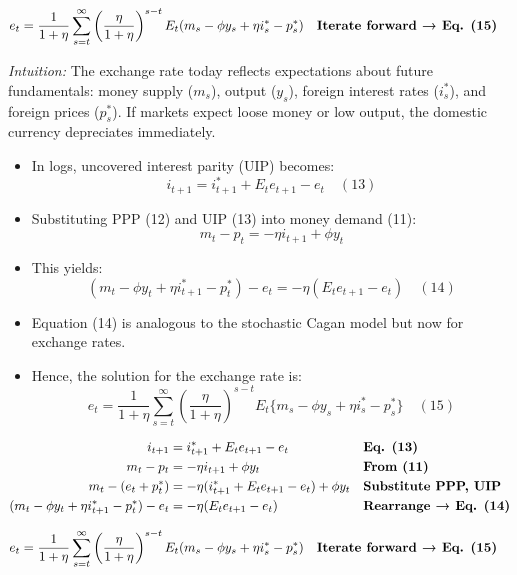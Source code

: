 \documentclass[12pt]{article}
\begin{document}
\begin{align}
e_t &= \frac{1}{1+\eta}\sum_{s=t}^\infty \left(\frac{\eta}{1+\eta}\right)^{s-t} 
E_t(m_s - \phi y_s + \eta i_s^* - p_s^*) && \text{\textbf{Iterate forward → Eq. (15)}}
\end{align}

\textit{Intuition:}  
The exchange rate today reflects expectations about future fundamentals: money supply ($m_s$), output ($y_s$), foreign interest rates ($i_s^*$), and foreign prices ($p_s^*$). If markets expect loose money or low output, the domestic currency depreciates immediately.
\begin{itemize}
    \item In logs, uncovered interest parity (UIP) becomes:  
    \[
        i_{t+1} = i_{t+1}^* + E_t e_{t+1} - e_t \quad (13)
    \]  
    \item Substituting PPP (12) and UIP (13) into money demand (11):  
    \[
        m_t - p_t = -\eta i_{t+1} + \phi y_t
    \]  
    \item This yields:  
    \[
        (m_t - \phi y_t + \eta i_{t+1}^* - p_t^*) - e_t = -\eta(E_t e_{t+1} - e_t) \quad (14)
    \]  
    \item Equation (14) is analogous to the stochastic Cagan model but now for exchange rates.  
    \item Hence, the solution for the exchange rate is:  
    \[
        e_t = \frac{1}{1+\eta}\sum_{s=t}^\infty \left(\frac{\eta}{1+\eta}\right)^{s-t} E_t\{m_s - \phi y_s + \eta i_s^* - p_s^*\} \quad (15)
    \]  
\end{itemize}

\singlespacing
\begin{align}
i_{t+1} &= i_{t+1}^* + E_t e_{t+1} - e_t && \text{\textbf{Eq. (13)}} \\
m_t - p_t &= -\eta i_{t+1} + \phi y_t && \text{\textbf{From (11)}} \\
m_t - (e_t + p_t^*) &= -\eta(i_{t+1}^* + E_t e_{t+1} - e_t) + \phi y_t && \text{\textbf{Substitute PPP, UIP}} \\
(m_t - \phi y_t + \eta i_{t+1}^* - p_t^*) - e_t &= -\eta(E_t e_{t+1} - e_t) && \text{\textbf{Rearrange → Eq. (14)}}
\end{align}

\begin{align}
e_t &= \frac{1}{1+\eta}\sum_{s=t}^\infty \left(\frac{\eta}{1+\eta}\right)^{s-t} 
E_t(m_s - \phi y_s + \eta i_s^* - p_s^*) && \text{\textbf{Iterate forward → Eq. (15)}}
\end{align}
\end{document}
